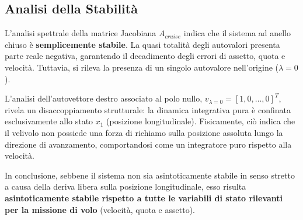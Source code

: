 \subsection{Analisi della Stabilità}
L'analisi spettrale della matrice Jacobiana $A_{cruise}$ indica che il sistema ad anello chiuso è \textbf{semplicemente stabile}. La quasi totalità degli autovalori presenta parte reale negativa, garantendo il decadimento degli errori di assetto, quota e velocità. Tuttavia, si rileva la presenza di un singolo autovalore nell'origine ($\lambda = 0$).

L'analisi dell'autovettore destro associato al polo nullo, $v_{\lambda=0} = [1, 0, \dots, 0]^T$, rivela un disaccoppiamento strutturale: 
la dinamica integrativa pura è confinata esclusivamente allo stato $x_1$ (posizione longitudinale). Fisicamente, ciò indica che il velivolo 
non possiede una forza di richiamo sulla posizione assoluta lungo la direzione di avanzamento, comportandosi come un integratore puro rispetto alla velocità.

In conclusione, sebbene il sistema non sia asintoticamente stabile in senso stretto a causa della deriva libera sulla posizione longitudinale, esso risulta \textbf{asintoticamente stabile rispetto a tutte le variabili di stato rilevanti per la missione di volo} (velocità, quota e assetto).


